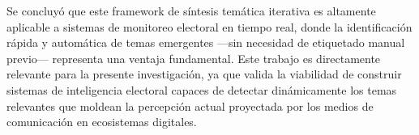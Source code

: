 Se concluyó que este framework de síntesis temática iterativa es altamente aplicable a sistemas de monitoreo electoral en tiempo real, donde la identificación rápida y automática de temas emergentes —sin necesidad de etiquetado manual previo— representa una ventaja fundamental. Este trabajo es directamente relevante para la presente investigación, ya que valida la viabilidad de construir sistemas de inteligencia electoral capaces de detectar dinámicamente los temas relevantes que moldean la percepción actual proyectada por los medios de comunicación en ecosistemas digitales.